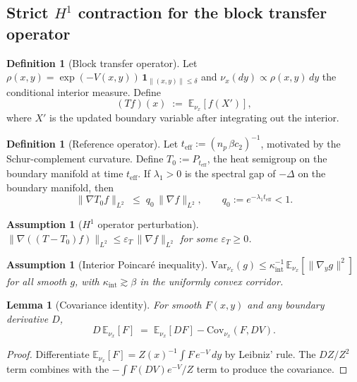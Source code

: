 \documentclass[11pt]{article}
\newtheorem{lemma}[theorem]{Lemma}
\newtheorem{assumption}[theorem]{Assumption}
\theoremstyle{definition}
\newtheorem{definition}[theorem]{Definition}
\newcommand{\E}{\mathbb{E}}
\newcommand{\Var}{\mathrm{Var}}
\newcommand{\Cov}{\mathrm{Cov}}
\newcommand{\1}{\mathbf{1}}
\newcommand{\norm}[1]{\lVert #1\rVert}
\begin{document}
\subsection{Strict $H^1$ contraction for the block transfer operator}

\begin{definition}[Block transfer operator]\label{def:T}
Let $\rho(x,y)=\exp(-V(x,y))\,\1_{\norm{(x,y)}\le\delta}$ and
$\nu_x(dy)\propto\rho(x,y)\,dy$ the conditional interior measure.  Define
\[
(Tf)(x) \;:=\; \E_{\nu_x}[f(X')],
\]
where $X'$ is the updated boundary variable after integrating out the interior.
\end{definition}

\begin{definition}[Reference operator]
Let $t_{\mathrm{eff}}:=(n_p\,\beta c_2)^{-1}$, motivated by the Schur-complement curvature.
Define $T_0:=P_{t_{\mathrm{eff}}}$, the heat semigroup on the boundary manifold at time
$t_{\mathrm{eff}}$.  If $\lambda_1>0$ is the spectral gap of $-\Delta$ on the boundary
manifold, then
\begin{equation}\label{eq:q0}
\norm{\nabla T_0 f}_{L^2} \;\le\; q_0\,\norm{\nabla f}_{L^2},\qquad
q_0 := e^{-\lambda_1 t_{\mathrm{eff}}} < 1.
\end{equation}
\end{definition}

\begin{assumption}[$H^1$ operator perturbation]\label{ass:HT}
$\norm{\nabla((T-T_0)f)}_{L^2}\le\varepsilon_T\,\norm{\nabla f}_{L^2}$ for some $\varepsilon_T\ge 0$.
\end{assumption}

\begin{assumption}[Interior Poincar\'e inequality]\label{ass:poinc}
$\Var_{\nu_x}(g)\le\kappa_{\mathrm{int}}^{-1}\,\E_{\nu_x}[\norm{\nabla_y g}^2]$ for all
smooth $g$, with $\kappa_{\mathrm{int}}\gtrsim\beta$ in the uniformly convex corridor.
\end{assumption}

\begin{lemma}[Covariance identity]\label{lem:cov-id}
For smooth $F(x,y)$ and any boundary derivative $D$,
\begin{equation}\label{eq:cov-id}
D\,\E_{\nu_x}[F] \;=\; \E_{\nu_x}[DF] - \Cov_{\nu_x}(F, DV).
\end{equation}
\end{lemma}

\begin{proof}
Differentiate $\E_{\nu_x}[F]=Z(x)^{-1}\int F\,e^{-V}\,dy$ by Leibniz' rule.  The
$DZ/Z^2$ term combines with the $-\int F(DV)e^{-V}/Z$ term to produce the covariance.
\end{proof}
\end{document}
